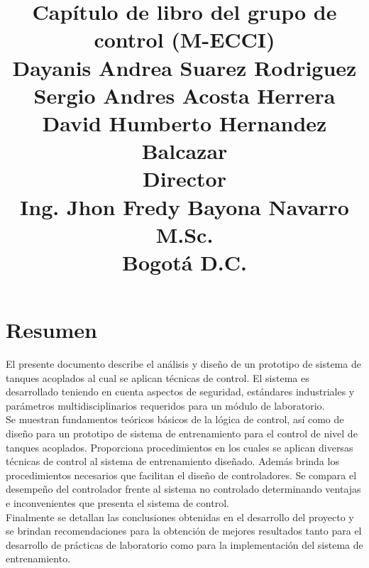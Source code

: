 \documentclass[a4paper,12pt,twoside]{proyectotanquesecci}
\title
{
\textbf{Capítulo de libro del grupo de control (M-ECCI)}\\
\vspace{3cm}
{\large 
Dayanis Andrea Suarez Rodriguez\\
Sergio Andres Acosta Herrera \\
David Humberto Hernandez Balcazar\\}
\vspace{1cm}
\textbf{Director}\\
{\large Ing. Jhon Fredy Bayona Navarro M.Sc.}\\
\vspace{2cm}
{\large Bogotá D.C.}
}
\begin{document}
\maketitle
\renewcommand{\contentsname}{Tabla de Contenido}
\renewcommand{\listfigurename}{Lista de Figuras}
\tableofcontents
\listoffigures







\chapter*{Resumen}

El presente documento describe el análisis y diseño de un prototipo de sistema de tanques acoplados al cual se aplican técnicas de control. El sistema es desarrollado teniendo en cuenta aspectos de seguridad, estándares industriales y parámetros multidisciplinarios requeridos para un módulo de laboratorio. \\

Se muestran fundamentos teóricos básicos de la lógica de control, así como de diseño para un prototipo de sistema de entrenamiento para el control de nivel de tanques acoplados. Proporciona procedimientos en los cuales se aplican diversas técnicas de control al sistema de entrenamiento diseñado. Además brinda los procedimientos necesarios que facilitan el diseño de controladores. Se compara el desempeño del controlador frente al sistema no controlado determinando ventajas e inconvenientes que presenta el sistema de control. \\

Finalmente se detallan las conclusiones obtenidas en el desarrollo del proyecto y se brindan recomendaciones para la obtención de mejores resultados tanto para el desarrollo de prácticas de laboratorio como para la implementación del sistema de entrenamiento. \\






\end{document}
